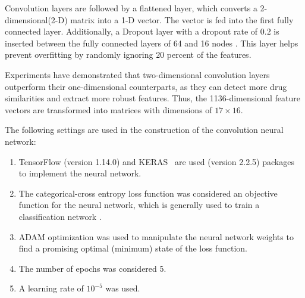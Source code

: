 \documentclass[unnumsec,webpdf,contemporary,large]{oup-authoring-template}%
\theoremstyle{thmstyleone}%
\theoremstyle{thmstyletwo}%
\theoremstyle{thmstylethree}%
\begin{document}
Convolution layers are followed by a flattened layer, which converts a 2-dimensional(2-D) matrix into a 1-D vector. The vector is fed into the first fully connected layer. Additionally, a Dropout layer with a dropout rate of $0.2$ is inserted between the fully connected layers of 64 and 16 nodes \cite{Srivastava2014}. This layer helps prevent overfitting by randomly ignoring $20$ percent of the features.

Experiments have demonstrated that two-dimensional convolution layers outperform their one-dimensional counterparts, as they can detect more drug similarities and extract more robust features. Thus, the 1136-dimensional feature vectors are transformed into matrices with dimensions of $17\times 16$.

The following settings are used in the construction of the convolution neural network:
\begin{enumerate}
    \item TensorFlow \cite{Abadi2016} (version 1.14.0) and KERAS~\cite{Keras} are used (version 2.2.5) packages to implement the neural network.
    \item The categorical-cross entropy loss function was considered an objective function for the neural network, which is generally used to train a classification network \cite{Ghosal_Edithal_Ekbal_Bhattacharyya_Chivukula_Tsatsaronis_2021, toda2019, giseop}.
    \item ADAM optimization \cite{Kingma2014} was used to manipulate the neural network weights to find a promising optimal (minimum) state of the loss function.
    \item The number of epochs was considered 5.
    \item A learning rate of $ 10^{-5}$ was used.
\end{enumerate}
\end{document}
